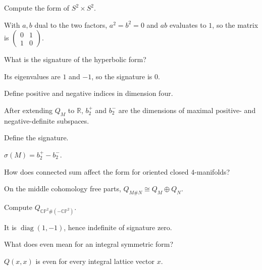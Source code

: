 \begin{problem}
Compute the form of $S^2\times S^2$.
\end{problem}
\begin{solution}
With $a,b$ dual to the two factors, $a^2=b^2=0$ and $ab$ evaluates to $1$, so the matrix is $\begin{pmatrix}0&1\\1&0\end{pmatrix}$.
\end{solution}

\begin{problem}
What is the signature of the hyperbolic form?
\end{problem}
\begin{solution}
Its eigenvalues are $1$ and $-1$, so the signature is $0$.
\end{solution}

\begin{problem}
Define positive and negative indices in dimension four.
\end{problem}
\begin{solution}
After extending $Q_M$ to $\mathbb R$, $b_2^+$ and $b_2^-$ are the dimensions of maximal positive- and negative-definite subspaces.
\end{solution}

\begin{problem}
Define the signature.
\end{problem}
\begin{solution}
$\sigma(M)=b_2^+-b_2^-$.
\end{solution}

\begin{problem}
How does connected sum affect the form for oriented closed $4$-manifolds?
\end{problem}
\begin{solution}
On the middle cohomology free parts, $Q_{M\#N}\cong Q_M\oplus Q_N$.
\end{solution}

\begin{problem}
Compute $Q_{\mathbb{CP}^2\#(-\mathbb{CP}^2)}$.
\end{problem}
\begin{solution}
It is $\operatorname{diag}(1,-1)$, hence indefinite of signature zero.
\end{solution}

\begin{problem}
What does even mean for an integral symmetric form?
\end{problem}
\begin{solution}
$Q(x,x)$ is even for every integral lattice vector $x$.
\end{solution}

